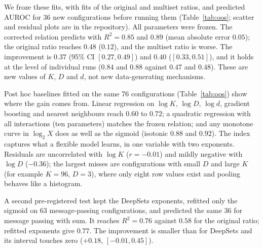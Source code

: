 \documentclass[conference]{IEEEtran}
\begin{document}
We froze these fits, with fits of the original and multiset ratios, and predicted AUROC for 36 new configurations before running them (Table~\ref{tab:oos}; scatter and residual plots are in the repository). All parameters were frozen. The corrected relation predicts with $R^2 = 0.85$ and $0.89$ (mean absolute error $0.05$); the original ratio reaches $0.48$ ($0.12$), and the multiset ratio is worse. The improvement is $0.37$ (95\% CI $[0.27, 0.49]$) and $0.40$ ($[0.33, 0.51]$), and it holds at the level of individual runs ($0.84$ and $0.88$ against $0.47$ and $0.48$). These are new values of $K$, $D$ and $d$, not new data-generating mechanisms.

Post hoc baselines fitted on the same 76 configurations (Table~\ref{tab:oos}) show where the gain comes from. Linear regression on $\log K$, $\log D$, $\log d$, gradient boosting and nearest neighbours reach $0.60$ to $0.72$; a quadratic regression with all interactions (ten parameters) matches the frozen relation; and any monotone curve in $\log_2 X$ does as well as the sigmoid (isotonic $0.88$ and $0.92$). The index captures what a flexible model learns, in one variable with two exponents. Residuals are uncorrelated with $\log K$ ($r = -0.01$) and mildly negative with $\log D$ ($-0.36$); the largest misses are configurations with small $D$ and large $K$ (for example $K = 96$, $D = 3$), where only eight row values exist and pooling behaves like a histogram.

A second pre-registered test kept the DeepSets exponents, refitted only the sigmoid on 63 message-passing configurations, and predicted the same 36 for message passing with sum. It reaches $R^2 = 0.76$ against $0.58$ for the original ratio; refitted exponents give $0.77$. The improvement is smaller than for DeepSets and its interval touches zero ($+0.18$, $[-0.01, 0.45]$).
\end{document}
